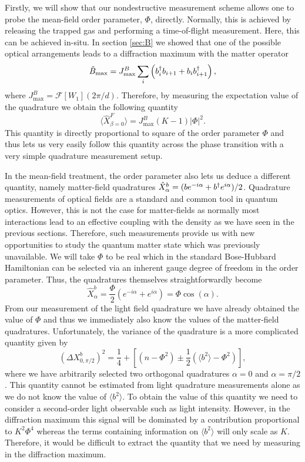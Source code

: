Firstly, we will show that our nondestructive measurement scheme
allows one to probe the mean-field order parameter, $\Phi$,
directly. Normally, this is achieved by releasing the trapped gas and
performing a time-of-flight measurement. Here, this can be achieved
in-situ. In section \ref{sec:B} we showed that one of the possible
optical arrangements leads to a diffraction maximum with the matter
operator
\begin{equation}
  \label{eq:Bmax}
  \hat{B}_\mathrm{max} = J^B_\mathrm{max} \sum_i \left( b^\dagger_i b_{i+1}
    + b_i b^\dagger_{i+1} \right),
\end{equation}
where $J^B_\mathrm{max} = \mathcal{F}[W_1](2\pi/d)$. Therefore, by measuring the
expectation value of the quadrature we obtain the following quantity
\begin{equation}
  \langle \hat{X}^F_{\beta=0} \rangle = J^B_\mathrm{max} (K-1) | \Phi |^2 .
\end{equation}
This quantity is directly proportional to square of the order
parameter $\Phi$ and thus lets us very easily follow this quantity
across the phase transition with a very simple quadrature measurement
setup. 

In the mean-field treatment, the order parameter also lets us deduce a
different quantity, namely matter-field quadratures
$\hat{X}^b_\alpha = (b e^{-i\alpha} + b^\dagger e^{i\alpha})/2$. Quadrature
measurements of optical fields are a standard and common tool in
quantum optics. However, this is not the case for matter-fields as
normally most interactions lead to an effective coupling with the
density as we have seen in the previous sections. Therefore, such
measurements provide us with new opportunities to study the quantum
matter state which was previously unavailable. We will take $\Phi$ to
be real which in the standard Bose-Hubbard Hamiltonian can be selected
via an inherent gauge degree of freedom in the order parameter. Thus,
the quadratures themselves straightforwardly become
\begin{equation}
  \hat{X}^b_\alpha = \frac{\Phi}{2} (e^{-i\alpha} + e^{i\alpha}) =
  \Phi \cos(\alpha).
\end{equation}
From our measurement of the light field quadrature we have already
obtained the value of $\Phi$ and thus we immediately also know the
values of the matter-field quadratures. Unfortunately, the variance of
the quadrature is a more complicated quantity given by
\begin{equation} 
  (\Delta X^b_{0,\pi/2})^2 = \frac{1}{4} + [(n - \Phi^2) \pm
  \frac{1}{2}(\langle b^2 \rangle - \Phi^2)],
\end{equation} 
where we have arbitrarily selected two orthogonal quadratures $\alpha
=0 $ and $\alpha = \pi / 2$. This quantity cannot be estimated from
light quadrature measurements alone as we do not know the value of
$\langle b^2 \rangle$. To obtain the value of this quantity we need to
consider a second-order light observable such as light
intensity. However, in the diffraction maximum this signal will be
dominated by a contribution proportional to $K^2 \Phi^4$ whereas the
terms containing information on $\langle b^2 \rangle$ will only scale
as $K$. Therefore, it would be difficult to extract the quantity that
we need by measuring in the diffraction maximum.

